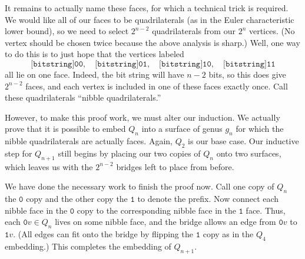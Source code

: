 It remains to actually name these faces, for which a technical trick is required. We would like all of our faces to be quadrilaterals (as in the Euler characteristic lower bound), so we need to select $2^{n-2}$ quadrilaterals from our $2^n$ vertices. (No vertex should be chosen twice because the above analysis is sharp.) Well, one way to do this is to just hope that the vertices labeled
\[\texttt{[bitstring]00},\quad\texttt{[bitstring]01},\quad\texttt{[bitstring]10},\quad\texttt{[bitstring]11}\]
all lie on one face. Indeed, the bit string will have $n-2$ bits, so this does give $2^{n-2}$ faces, and each vertex is included in one of these faces exactly once. Call these quadrilaterals ``nibble quadrilaterals.''

However, to make this proof work, we must alter our induction. We actually prove that it is possible to embed $Q_n$ into a surface of genus $g_n$ for which the nibble quadrilaterals are actually faces. Again, $Q_2$ is our base case. Our inductive step for $Q_{n+1}$ still begins by placing our two copies of $Q_n$ onto two surfaces, which leaves us with the $2^{n-2}$ bridges left to place from before.

We have done the necessary work to finish the proof now. Call one copy of $Q_n$ the $\texttt{0}$ copy and the other copy the $\texttt{1}$ to denote the prefix. Now connect each nibble face in the $\texttt{0}$ copy to the corresponding nibble face in the $\texttt{1}$ face. Thus, each $\texttt{0}v\in Q_n$ lives on some nibble face, and the bridge allows an edge from $\texttt{0}v$ to $\texttt{1}v.$ (All edges can fit onto the bridge by flipping the $\texttt{1}$ copy as in the $Q_4$ embedding.) This completes the embedding of $Q_{n+1}.$